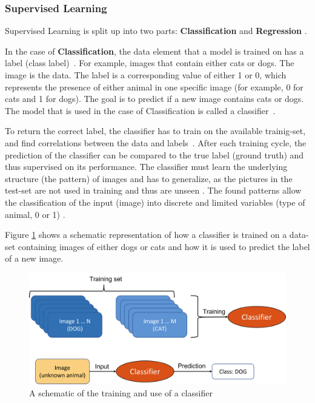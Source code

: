 \subsubsection*{Supervised Learning}\label{SUPER}
Supervised Learning is split up into two parts: \textbf{Classification} and \textbf{Regression} \cite{Janiesch,Theodoridis}.

In the case of \textbf{Classification}, the data element that a model is trained on has a label (class label)~\cite{Carleo}. For example, images that contain either cats or dogs. The image is the data. The label is a corresponding value of either 1 or 0, which represents the presence of either animal in one specific image (for example, 0 for cats and 1 for dogs). The goal is to predict if a new image contains cats or dogs. The model that is used in the case of Classification is called a classifier~\cite{Theodoridis}.

To return the correct label, the classifier has to train on the available trainig-set, and find correlations between the data and labels~\cite{Carleo}.
After each training cycle, the prediction of the classifier can be compared to the true label (ground truth) and thus supervised on its performance.
\newpage
The classifier must learn the underlying structure (the pattern) of images and has to generalize, as the pictures in the test-set are not used in training and thus are unseen \cite{Bishop}. 
The found patterns allow the classification of the input (image) into discrete and limited variables (type of animal, 0 or 1) \cite{Theodoridis}.

Figure \ref{fig:CATDOG} shows a schematic representation of how a classifier is trained on a data-set containing images of either dogs or cats and how it is used to predict the label of a new image.

\begin{figure}[H]
	\centering
	\includegraphics[width=0.9\linewidth]{IMGs/CATDOG.png}
	\caption{A schematic of the training and use of a classifier}
	\label{fig:CATDOG}
\end{figure}



